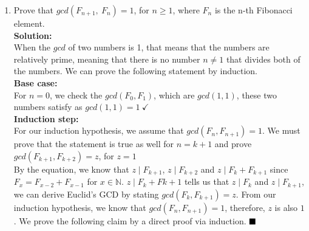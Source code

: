\documentclass{article}
\begin{document}
    \begin{enumerate}[label=\textbf{Q3}]
        \item Prove that $gcd(F_{n+1},\ F_n) = 1$, for $n \geq 1$, where $F_n$
        is the n-th Fibonacci element.\\
        \textbf{Solution: }\\
        When the $gcd$ of two numbers is 1, that means that the numbers are
        relatively prime, meaning that there is no number $n \neq 1$ that divides
        both of the numbers. We can prove the following statement by induction.\\
        \textbf{Base case:}\\
        For $n = 0$, we check the $gcd(F_0, F_1)$, which are $gcd(1, 1)$, these two
        numbers satisfy as $gcd(1,1) = 1\ \checkmark$\\
        \textbf{Induction step:}\\
        For our induction hypothesis, we assume that $gcd(F_n, F_{n+1}) = 1$. We must
        prove that the statement is true as well for $n = k + 1$ and prove $gcd(F_{k+1}, F_{k+2}) = z$,
        for $z = 1$\\
        By the equation, we know that $z \mid F_{k+1}$, $z \mid F_{k+2}$ and $z \mid F_{k} + F_{k+1}$
        since $F_x = F_{x - 2} + F_{x - 1}$ for $x \in \mathbb{N}$. $z \mid F_k + F{k+1}$ tells us that
        $z \mid F_k$ and $z \mid F_{k+1}$, we can derive Euclid's GCD by stating $gcd(F_k, F_{k+1}) = z$.
        From our induction hypothesis, we know that $gcd(F_n, F_{n+1}) = 1$, therefore, $z$ is also $1$.
        We prove the following claim by a direct proof via induction. $\hfill \blacksquare$
        
    \end{enumerate}
\end{document}
